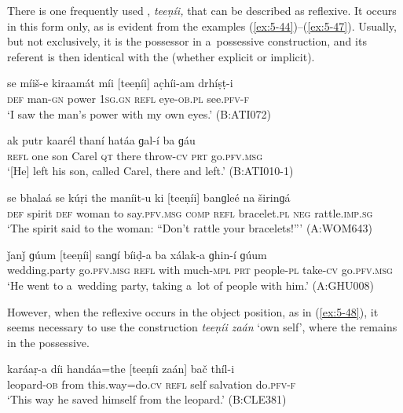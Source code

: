 There is one frequently used , \textit{teeṇíi,} that can be described as reflexive. It
occurs in this form only, as is evident from the examples (\ref{ex:5-44})--(\ref{ex:5-47}). Usually, but not
exclusively, it is the possessor in a~possessive construction, and its referent is then identical
with the   (whether explicit or implicit).

\begin{exe}
\ex
\label{ex:5-44}
\gll se míiš-e kiraamát míi [teeṇíi] ac̣híi-am drhíṣṭ-i\\
\textsc{def} man-\textsc{gn} power \textsc{1sg.gn} \textsc{refl} eye-\textsc{ob.pl} see.\textsc{pfv-f}\\
\glt `I saw the man's power with my own eyes.' (B:ATI072)

\ex
\label{ex:5-45}
\gll [teeṇíi] ak putr kaarél thaní hatáa ɡal-í ba ɡáu \\
\textsc{refl} one son Carel \textsc{qt} there throw-\textsc{cv} \textsc{prt} go.\textsc{pfv.msg}\\
\glt `[He] left his son, called Carel, there and left.' (B:ATI010-1)

\ex
\label{ex:5-46}
\gll se bhalaá se kúṛi the maníit-u ki [teeṇíi] banɡleé na širinɡá\\
\textsc{def} spirit \textsc{def} woman to say.\textsc{pfv.msg} \textsc{comp} \textsc{refl} bracelet.\textsc{pl} \textsc{neg} rattle.\textsc{imp.sg}\\
\glt `The spirit said to the woman: ``Don't rattle your bracelets!''' (A:WOM643)

\ex
\label{ex:5-47}
\gll ǰanǰ ɡúum [teeṇíi] sanɡí bíiḍ-a ba xálak-a ɡhin-í ɡúum\\
wedding.party go.\textsc{pfv.msg } \textsc{refl} with much-\textsc{mpl} \textsc{prt} people-\textsc{pl} take-\textsc{cv} go.\textsc{pfv.msg}\\
\glt `He went to a~wedding party, taking a~lot of people with him.' (A:GHU008)
\end{exe}
However, when the reflexive occurs in the object position, as in (\ref{ex:5-48}), it seems necessary to use the construction \textit{teeṇíi zaán} `own self', where the  remains in the possessive.
\begin{exe}
\ex
\label{ex:5-48}
\gll karáaṛ-a díi handáa=the [teeṇíi zaán] bač thíl-i\\
leopard-\textsc{ob} from this.way=do.\textsc{cv} \textsc{refl} self salvation do.\textsc{pfv-f}\\
\glt `This way he saved himself from the leopard.' (B:CLE381)
\end{exe}

